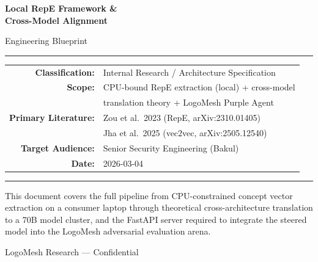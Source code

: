 \documentclass[11pt, a4paper]{article}
\begin{document}
\begin{titlepage}
  \centering
  \vspace*{3cm}
  {\Huge\bfseries\color{darkgray} Local RepE Framework \&\\[6pt] Cross-Model Alignment\par}
  \vspace{0.8cm}
  {\Large\color{accent} Engineering Blueprint\par}
  \vspace{1.2cm}
  \rule{12cm}{1pt}
  \vspace{0.6cm}

  \begin{tabular}{rl}
    \textbf{Classification:} & Internal Research / Architecture Specification \\[4pt]
    \textbf{Scope:}          & CPU-bound RepE extraction (local) + cross-model \\
                             & translation theory + LogoMesh Purple Agent \\[4pt]
    \textbf{Primary Literature:} & Zou et al.\ 2023 (RepE, arXiv:2310.01405) \\
                                 & Jha et al.\ 2025 (vec2vec, arXiv:2505.12540) \\[4pt]
    \textbf{Target Audience:} & Senior Security Engineering (Bakul) \\[4pt]
    \textbf{Date:}           & 2026-03-04 \\
  \end{tabular}

  \vspace{1.2cm}
  \rule{12cm}{1pt}
  \vspace{2cm}

  \begin{minipage}{10cm}
    \centering\small\color{darkgray}
    This document covers the full pipeline from CPU-constrained concept vector
    extraction on a consumer laptop through theoretical cross-architecture
    translation to a 70B model cluster, and the FastAPI server required to
    integrate the steered model into the LogoMesh adversarial evaluation arena.
  \end{minipage}

  \vfill
  {\small\color{darkgray} LogoMesh Research --- Confidential}
\end{titlepage}

\tableofcontents
\clearpage
\end{document}
